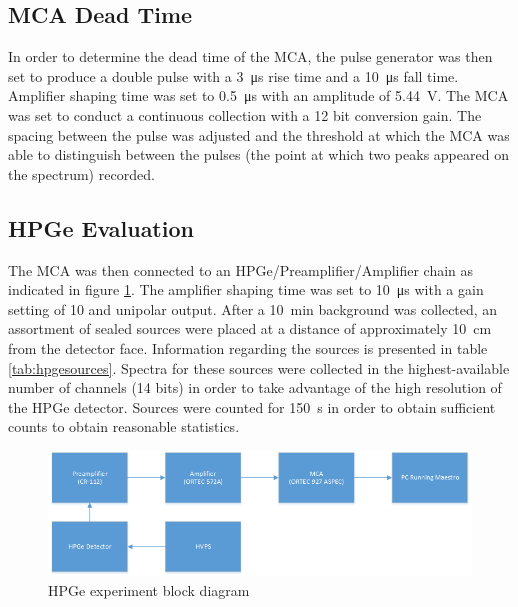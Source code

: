 \documentclass[12pt]{article}
\begin{document}
\subsection{MCA Dead Time}
In order to determine the dead time of the MCA, the pulse generator was then set to produce a double pulse with a \SI{3}{\micro\second} rise time and a \SI{10}{\micro\second} fall time. Amplifier shaping time was set to \SI{0.5}{\micro\second} with an amplitude of \SI{5.44}{\volt}. The MCA was set to conduct a continuous collection with a 12 bit conversion gain. The spacing between the pulse was adjusted and the threshold at which the MCA was able to distinguish between the pulses (the point at which two peaks appeared on the spectrum) recorded. 

\subsection{HPGe Evaluation}
The MCA was then connected to an HPGe/Preamplifier/Amplifier chain as indicated in figure \ref{fig:hpgeblock}. The amplifier shaping time was set to \SI{10}{\micro\second} with a gain setting of 10 and unipolar output. After a \SI{10}{\minute} background was collected, an assortment of sealed sources were placed at a distance of approximately \SI{10}{\centi\meter} from the detector face. Information regarding the sources is presented in table \ref{tab:hpgesources}. Spectra for these sources were collected in the highest-available number of channels (14 bits) in order to take advantage of the high resolution of the HPGe detector. Sources were counted for \SI{150}{\second} in order to obtain sufficient counts to obtain reasonable statistics.

\begin{center}
\begin{figure}
	\includegraphics[width=\linewidth]{block2}
	\caption{HPGe experiment block diagram}
	\label{fig:hpgeblock}
\end{figure}
\end{center}
\end{document}
